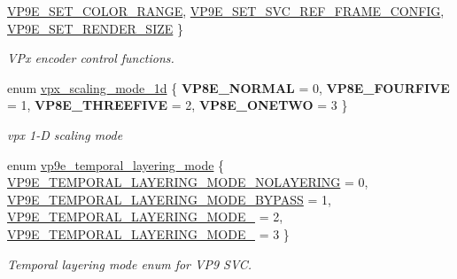 \begin{DoxyCompactItemize}
\hyperlink{group__vp8__encoder_gga6deae3d561c838952552c3d3756322eca5197d959e8a124180de5f7a4bb240595}{V\+P9\+E\+\_\+\+S\+E\+T\+\_\+\+C\+O\+L\+O\+R\+\_\+\+R\+A\+N\+GE}, 
\hyperlink{group__vp8__encoder_gga6deae3d561c838952552c3d3756322ecaa0d822d0d1efa1868ce05d8523a8836b}{V\+P9\+E\+\_\+\+S\+E\+T\+\_\+\+S\+V\+C\+\_\+\+R\+E\+F\+\_\+\+F\+R\+A\+M\+E\+\_\+\+C\+O\+N\+F\+IG}, 
\hyperlink{group__vp8__encoder_gga6deae3d561c838952552c3d3756322ecacabcfc4edba61f54d6a7b7592a64e48b}{V\+P9\+E\+\_\+\+S\+E\+T\+\_\+\+R\+E\+N\+D\+E\+R\+\_\+\+S\+I\+ZE}
 \}\begin{DoxyCompactList}\small\item\em V\+Px encoder control functions. \end{DoxyCompactList}
\item 
enum \hyperlink{group__vp8__encoder_ga70071b1bb6cac9a1ef0ea3d8362ff94f}{vpx\+\_\+scaling\+\_\+mode\+\_\+1d} \{ {\bfseries V\+P8\+E\+\_\+\+N\+O\+R\+M\+AL} = 0, 
{\bfseries V\+P8\+E\+\_\+\+F\+O\+U\+R\+F\+I\+VE} = 1, 
{\bfseries V\+P8\+E\+\_\+\+T\+H\+R\+E\+E\+F\+I\+VE} = 2, 
{\bfseries V\+P8\+E\+\_\+\+O\+N\+E\+T\+WO} = 3
 \}\begin{DoxyCompactList}\small\item\em vpx 1-\/D scaling mode \end{DoxyCompactList}
\item 
enum \hyperlink{group__vp8__encoder_gabe875c0c3993e488ffb342cf548a8ce8}{vp9e\+\_\+temporal\+\_\+layering\+\_\+mode} \{ \hyperlink{group__vp8__encoder_ggabe875c0c3993e488ffb342cf548a8ce8ac9713fea328d8c59130250a6d5b35add}{V\+P9\+E\+\_\+\+T\+E\+M\+P\+O\+R\+A\+L\+\_\+\+L\+A\+Y\+E\+R\+I\+N\+G\+\_\+\+M\+O\+D\+E\+\_\+\+N\+O\+L\+A\+Y\+E\+R\+I\+NG} = 0, 
\hyperlink{group__vp8__encoder_ggabe875c0c3993e488ffb342cf548a8ce8a680204f7c9d48155170bcb3fc6e673e8}{V\+P9\+E\+\_\+\+T\+E\+M\+P\+O\+R\+A\+L\+\_\+\+L\+A\+Y\+E\+R\+I\+N\+G\+\_\+\+M\+O\+D\+E\+\_\+\+B\+Y\+P\+A\+SS} = 1, 
\hyperlink{group__vp8__encoder_ggabe875c0c3993e488ffb342cf548a8ce8a7bb06aacd0b926d40a7df261fa2937b9}{V\+P9\+E\+\_\+\+T\+E\+M\+P\+O\+R\+A\+L\+\_\+\+L\+A\+Y\+E\+R\+I\+N\+G\+\_\+\+M\+O\+D\+E\+\_} = 2, 
\hyperlink{group__vp8__encoder_ggabe875c0c3993e488ffb342cf548a8ce8ad2a4ba7d6535ce3514fec130c806d457}{V\+P9\+E\+\_\+\+T\+E\+M\+P\+O\+R\+A\+L\+\_\+\+L\+A\+Y\+E\+R\+I\+N\+G\+\_\+\+M\+O\+D\+E\+\_} = 3
 \}\begin{DoxyCompactList}\small\item\em Temporal layering mode enum for V\+P9 S\+VC. \end{DoxyCompactList}
\item 

\end{DoxyCompactItemize}
